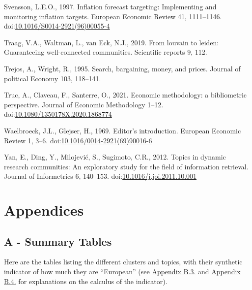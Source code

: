 \documentclass[
]{article}
\newlength{\cslhangindent}
\newlength{\cslentryspacingunit} %
\newenvironment{CSLReferences}[2] %
 {%
  \setlength{\parindent}{0pt}
  \ifodd #1
  \let\oldpar\par
  \def\par{\hangindent=\cslhangindent\oldpar}
  \fi
  \setlength{\parskip}{#2\cslentryspacingunit}
 }%
 {}
\begin{document}
\begin{CSLReferences}{1}{0}
\leavevmode{}%
Svensson, L.E.O., 1997. Inflation forecast targeting: {Implementing} and
monitoring inflation targets. European Economic Review 41, 1111--1146.
doi:\href{https://doi.org/10.1016/S0014-2921(96)00055-4}{10.1016/S0014-2921(96)00055-4}

\leavevmode{}%
Traag, V.A., Waltman, L., van Eck, N.J., 2019. From louvain to leiden:
Guaranteeing well-connected communities. Scientific reports 9, 112.

\leavevmode{}%
Trejos, A., Wright, R., 1995. Search, bargaining, money, and prices.
Journal of political Economy 103, 118--141.

\leavevmode{}%
Truc, A., Claveau, F., Santerre, O., 2021. Economic methodology: a
bibliometric perspective. Journal of Economic Methodology 1--12.
doi:\href{https://doi.org/10.1080/1350178X.2020.1868774}{10.1080/1350178X.2020.1868774}

\leavevmode{}%
Waelbroeck, J.L., Glejser, H., 1969. Editor's introduction. European
Economic Review 1, 3--6.
doi:\href{https://doi.org/10.1016/0014-2921(69)90016-6}{10.1016/0014-2921(69)90016-6}

\leavevmode{}%
Yan, E., Ding, Y., Milojević, S., Sugimoto, C.R., 2012. Topics in
dynamic research communities: {An} exploratory study for the field of
information retrieval. Journal of Informetrics 6, 140--153.
doi:\href{https://doi.org/10.1016/j.joi.2011.10.001}{10.1016/j.joi.2011.10.001}

\end{CSLReferences}

\newpage

\hypertarget{appendices}{%
\section*{Appendices}\label{appendices}}

\hypertarget{a---summary-tables}{%
\subsection*{A - Summary Tables}\label{a---summary-tables}}

Here are the tables listing the different clusters and topics, with
their synthetic indicator of how much they are ``European'' (see
\protect\hyperlink{network}{Appendix B.3.} and
\protect\hyperlink{topic}{Appendix B.4.} for explanations on the
calculus of the indicator).
\end{document}
